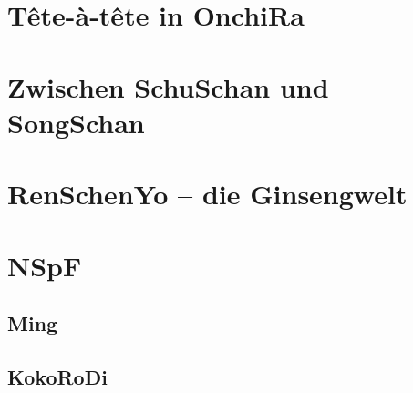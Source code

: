 \documentclass[12pt,a4paper,germanpar]{scrartcl}
\begin{document}
\section{Tête-à-tête in OnchiRa}

\section{Zwischen SchuSchan und SongSchan}

\section{RenSchenYo -- die Ginsengwelt}

\appendix

\section{NSpF}

\subsection{Ming}

\subsection{KokoRoDi}

\end{document}
